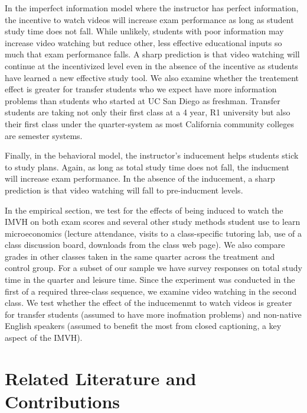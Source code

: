 \documentclass[12pt]{article}
\begin{document}
In the imperfect information model where the instructor has perfect information, the incentive to watch videos will increase exam performance as long as student study time does not fall.  While unlikely, students with poor information may increase video watching but reduce other, less effective educational inputs so much that exam performance falls. A sharp prediction is that video watching will continue at the incentivized level even in the absence of the incentive as students have learned a new effective study tool. We also examine whether the treatement effect is greater for transfer students who we expect have more information problems than students who started at UC San Diego as freshman.  Transfer students are taking not only their first class at a 4 year, R1 university but also their first class under the quarter-system as most California community colleges are semester systems.

Finally, in the behavioral model, the instructor's inducement helps students stick to study plans.  Again, as long as total study time does not fall, the inducment will increase exam performance.  In the absence of the inducement, a sharp prediction is that video watching will fall to pre-inducment levels.  

In the empirical section, we test for the effects of being induced to watch the IMVH on both exam scores and several other study methods student use to learn microeconomics (lecture attendance, visits to a class-specific tutoring lab, use of a class discussion board, downloads from the class web page).  We also compare grades in other classes taken in the same quarter across the treatment and control group.  For a subset of our sample we have survey responses on total study time in the quarter and leisure time.  Since the experiment was conducted in the first of a required three-class sequence, we examine video watching in the second class.  We test whether the effect of the inducemenmt to watch videos is greater for transfer students (assumed to have more inofmation problems) and non-native English speakers (assumed to benefit the most from closed captioning, a key aspect of the IMVH).   

\section{Related Literature and Contributions} \label{background}
\end{document}
